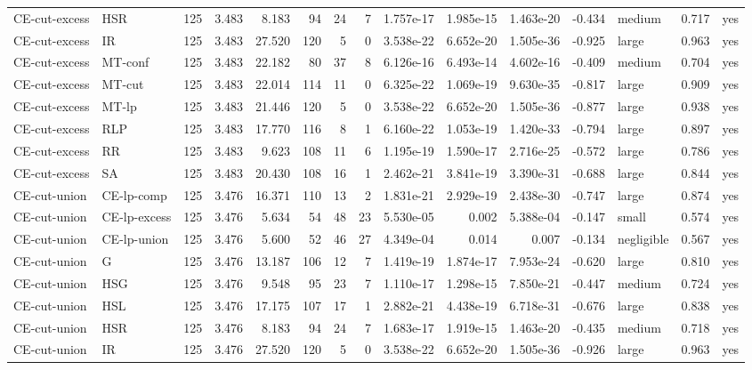 \begin{table}[htbp]
\begin{tabular}{llrrrrrrrrrrlrr}
CE-cut-excess & HSR & 125 & 3.483 & 8.183 & 94 & 24 & 7 & 1.757e-17 & 1.985e-15 & 1.463e-20 & -0.434 & medium & 0.717 & yes \\
CE-cut-excess & IR & 125 & 3.483 & 27.520 & 120 & 5 & 0 & 3.538e-22 & 6.652e-20 & 1.505e-36 & -0.925 & large & 0.963 & yes \\
CE-cut-excess & MT-conf & 125 & 3.483 & 22.182 & 80 & 37 & 8 & 6.126e-16 & 6.493e-14 & 4.602e-16 & -0.409 & medium & 0.704 & yes \\
CE-cut-excess & MT-cut & 125 & 3.483 & 22.014 & 114 & 11 & 0 & 6.325e-22 & 1.069e-19 & 9.630e-35 & -0.817 & large & 0.909 & yes \\
CE-cut-excess & MT-lp & 125 & 3.483 & 21.446 & 120 & 5 & 0 & 3.538e-22 & 6.652e-20 & 1.505e-36 & -0.877 & large & 0.938 & yes \\
CE-cut-excess & RLP & 125 & 3.483 & 17.770 & 116 & 8 & 1 & 6.160e-22 & 1.053e-19 & 1.420e-33 & -0.794 & large & 0.897 & yes \\
CE-cut-excess & RR & 125 & 3.483 & 9.623 & 108 & 11 & 6 & 1.195e-19 & 1.590e-17 & 2.716e-25 & -0.572 & large & 0.786 & yes \\
CE-cut-excess & SA & 125 & 3.483 & 20.430 & 108 & 16 & 1 & 2.462e-21 & 3.841e-19 & 3.390e-31 & -0.688 & large & 0.844 & yes \\
CE-cut-union & CE-lp-comp & 125 & 3.476 & 16.371 & 110 & 13 & 2 & 1.831e-21 & 2.929e-19 & 2.438e-30 & -0.747 & large & 0.874 & yes \\
CE-cut-union & CE-lp-excess & 125 & 3.476 & 5.634 & 54 & 48 & 23 & 5.530e-05 & 0.002 & 5.388e-04 & -0.147 & small & 0.574 & yes \\
CE-cut-union & CE-lp-union & 125 & 3.476 & 5.600 & 52 & 46 & 27 & 4.349e-04 & 0.014 & 0.007 & -0.134 & negligible & 0.567 & yes \\
CE-cut-union & G & 125 & 3.476 & 13.187 & 106 & 12 & 7 & 1.419e-19 & 1.874e-17 & 7.953e-24 & -0.620 & large & 0.810 & yes \\
CE-cut-union & HSG & 125 & 3.476 & 9.548 & 95 & 23 & 7 & 1.110e-17 & 1.298e-15 & 7.850e-21 & -0.447 & medium & 0.724 & yes \\
CE-cut-union & HSL & 125 & 3.476 & 17.175 & 107 & 17 & 1 & 2.882e-21 & 4.438e-19 & 6.718e-31 & -0.676 & large & 0.838 & yes \\
CE-cut-union & HSR & 125 & 3.476 & 8.183 & 94 & 24 & 7 & 1.683e-17 & 1.919e-15 & 1.463e-20 & -0.435 & medium & 0.718 & yes \\
CE-cut-union & IR & 125 & 3.476 & 27.520 & 120 & 5 & 0 & 3.538e-22 & 6.652e-20 & 1.505e-36 & -0.926 & large & 0.963 & yes \\

\end{tabular}
\end{table}
